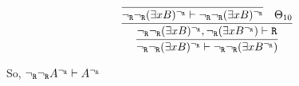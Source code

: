\begin{enumerate}[(i)]
\begin{itemize}
            $$
                \infer{
                    \neg_\R\neg_\R(\exists x B)^{\neg_\R} \vdash \neg_\R\neg_\R(\exists x B^{\neg_\R})
                }{
                    \infer{
                        \neg_\R\neg_\R(\exists x B)^{\neg_\R}, \neg_\R(\exists x B^{\neg_\R}) \vdash \R
                    }{
                        \infer{
                            \neg_\R\neg_\R(\exists x B)^{\neg_\R} \vdash \neg_\R\neg_\R(\exists x B)^{\neg_\R}
                        }{
                        }&
                        \Theta_{10}
                    }
                }
            $$
    \end{itemize}
    So, $\neg_{\texttt{R}}\neg_{\texttt{R}} A^{\neg_{\texttt{R}}}\vdash A^{\neg_{\texttt{R}}}$
\end{enumerate}